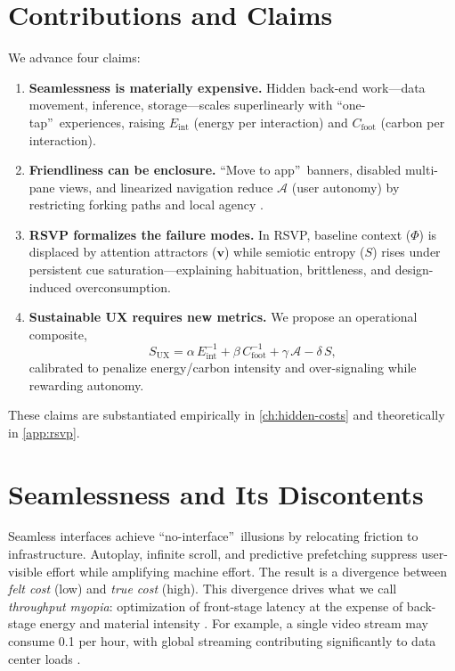 \documentclass[openany]{book}
\newcommand{\PhiS}{\Phi} %
\newcommand{\vvec}{\mathbf{v}} %
\newcommand{\Sent}{S} %
\newcommand{\Eint}{E_{\mathrm{int}}} %
\newcommand{\Cfoot}{C_{\mathrm{foot}}} %
\newcommand{\Auton}{\mathcal{A}} %
\newcommand{\SUX}{S_{\mathrm{UX}}} %
\newcommand{\kWh}{\mathrm{kWh}}
\begin{document}
\section{Contributions and Claims}
\label{sec:intro-claims}
We advance four claims:
\begin{enumerate}[label=\textbf{C\arabic*}.]
  \item \textbf{Seamlessness is materially expensive.} Hidden back-end work---data movement, inference, storage---scales superlinearly with \textquotedblleft one-tap\textquotedblright\ experiences, raising $\Eint$ (energy per interaction) and $\Cfoot$ (carbon per interaction).
  \item \textbf{Friendliness can be enclosure.} \textquotedblleft Move to app\textquotedblright\ banners, disabled multi-pane views, and linearized navigation reduce $\Auton$ (user autonomy) by restricting forking paths and local agency \citep{doctorow2022}.
  \item \textbf{RSVP formalizes the failure modes.} In RSVP, baseline context (\(\PhiS\)) is displaced by attention attractors (\(\vvec\)) while semiotic entropy (\(\Sent\)) rises under persistent cue saturation---explaining habituation, brittleness, and design-induced overconsumption.
  \item \textbf{Sustainable UX requires new metrics.} We propose an operational composite,
  \begin{equation}
  \label{eq:intro-SUX}
  \SUX = \alpha\,\Eint^{-1} + \beta\,\Cfoot^{-1} + \gamma\,\Auton - \delta\,\Sent,
  \end{equation}
  calibrated to penalize energy/carbon intensity and over-signaling while rewarding autonomy.
\end{enumerate}
These claims are substantiated empirically in \cref{ch:hidden-costs} and theoretically in \cref{app:rsvp}.

\section{Seamlessness and Its Discontents}
\label{sec:intro-seamless}
Seamless interfaces achieve \textquotedblleft no-interface\textquotedblright\ illusions by relocating friction to infrastructure. Autoplay, infinite scroll, and predictive prefetching suppress user-visible effort while amplifying machine effort. The result is a divergence between \emph{felt cost} (low) and \emph{true cost} (high). This divergence drives what we call \emph{throughput myopia}: optimization of front-stage latency at the expense of back-stage energy and material intensity \citep{norman1988,colak2024,designlab2024}. For example, a single video stream may consume \SI{0.1}{\kWh} per hour, with global streaming contributing significantly to data center loads \citep{extentia2024}.
\end{document}
